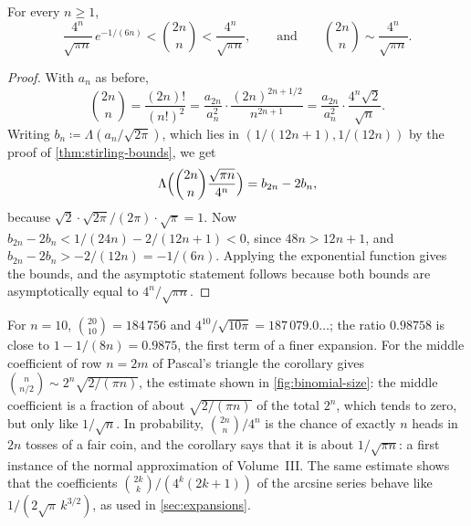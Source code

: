 \begin{corollary}
\label{cor:central-binomial}
For every $n\ge1$,
\[
\frac{4^n}{\sqrt{\pi n}}\,e^{-1/(6n)}<\binom{2n}n<\frac{4^n}{\sqrt{\pi n}},\qquad\text{and}\qquad\binom{2n}n\sim\frac{4^n}{\sqrt{\pi n}} .
\]
\end{corollary}

\begin{proof}
With $a_n$ as before,
\[
\binom{2n}n=\frac{(2n)!}{(n!)^2}=\frac{a_{2n}}{a_n^2}\cdot\frac{(2n)^{2n+1/2}}{n^{2n+1}}=\frac{a_{2n}}{a_n^2}\cdot\frac{4^n\sqrt2}{\sqrt n}.
\]
Writing $b_n\coloneqq\Lambda(a_n/\sqrt{2\pi})$, which lies in $(1/(12n+1),1/(12n))$ by the proof of \cref{thm:stirling-bounds}, we get
\[
\Lambda\Bigl(\binom{2n}n\frac{\sqrt{\pi n}}{4^n}\Bigr)=b_{2n}-2b_n ,
\]
because $\sqrt{2}\cdot\sqrt{2\pi}/(2\pi)\cdot\sqrt\pi=1$. Now $b_{2n}-2b_n<1/(24n)-2/(12n+1)<0$, since $48n>12n+1$, and $b_{2n}-2b_n>-2/(12n)=-1/(6n)$. Applying the exponential function gives the bounds, and the asymptotic statement follows because both bounds are asymptotically equal to $4^n/\sqrt{\pi n}$.
\end{proof}

For $n=10$, $\binom{20}{10}=184\,756$ and $4^{10}/\sqrt{10\pi}=187\,079.0\ldots$; the ratio $0.98758$ is close to $1-1/(8n)=0.9875$, the first term of a finer expansion. For the middle coefficient of row $n=2m$ of Pascal's triangle the corollary gives $\binom n{n/2}\sim2^n\sqrt{2/(\pi n)}$, the estimate shown in \cref{fig:binomial-size}: the middle coefficient is a fraction of about $\sqrt{2/(\pi n)}$ of the total $2^n$, which tends to zero, but only like $1/\sqrt n$. In probability, $\binom{2n}n/4^n$ is the chance of exactly $n$ heads in $2n$ tosses of a fair coin, and the corollary says that it is about $1/\sqrt{\pi n}$: a first instance of the normal approximation of Volume~III. The same estimate shows that the coefficients $\binom{2k}k/(4^k(2k+1))$ of the arcsine series behave like $1/(2\sqrt\pi\,k^{3/2})$, as used in \cref{sec:expansions}.

